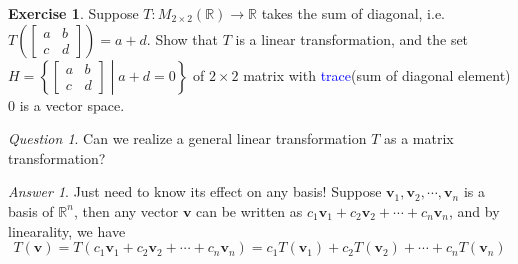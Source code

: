 \documentclass{beamer}
\theoremstyle{definition}
\newtheorem{exercise}[theorem]{Exercise}
\theoremstyle{remark}
\newtheorem*{question}{Question}
\newtheorem*{answer}{Answer}
\begin{document}
\begin{frame}[t]
\begin{exercise}
Suppose $T:M_{2\times2}(\mathbb R)\to\mathbb R$ takes the sum of diagonal, i.e. $T\left(\begin{bmatrix}
a&b\\c&d
\end{bmatrix}\right)=a+d$. Show that $T$ is a linear transformation, and the set $H=\left\{\begin{bmatrix}
a&b\\c&d
\end{bmatrix}\middle|a+d=0\right\}$ of $2\times2$ matrix with \textcolor{blue}{trace}(sum of diagonal element) 0 is a vector space.
\end{exercise}
\end{frame}

\begin{frame}[t]
\begin{question}
Can we realize a general linear transformation $T$ as a matrix transformation?
\end{question}
\pause
\begin{answer}
Just need to know its effect on any basis! Suppose $\mathbf v_1,\mathbf v_2,\cdots,\mathbf v_n$ is a basis of $\mathbb R^n$, then any vector $\mathbf v$ can be written as $c_1\mathbf v_1+c_2\mathbf v_2+\cdots+c_n\mathbf v_n$, and by linearality, we have
\begin{equation}\label{19:13-06/07/2022}
T(\mathbf v)=T(c_1\mathbf v_1+c_2\mathbf v_2+\cdots+c_n\mathbf v_n)=c_1T(\mathbf v_1)+c_2T(\mathbf v_2)+\cdots+c_nT(\mathbf v_n)
\end{equation}
\end{answer}
\end{frame}
\end{document}
